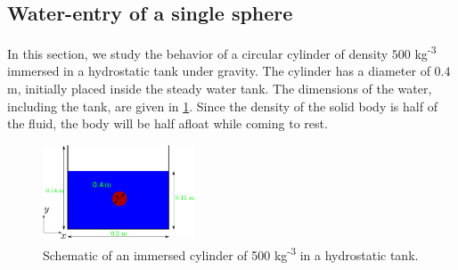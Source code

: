 



\FloatBarrier%
\subsection{Water-entry of a single sphere}
\label{sec:water-entry-sphere}
In this section, we study the behavior of a circular cylinder of density $500$
kg\textsuperscript{-3} immersed in a hydrostatic tank under gravity. The
cylinder has a diameter of $0.4$ m, initially placed inside the steady water
tank. The dimensions of the water, including the tank, are given in
\cref{fig:water-entry-sphere-schematic}. Since the density of the solid body is
half of the fluid, the body will be half afloat while coming to rest.
\begin{figure}[!htpb]
  \centering
  \includegraphics[width=0.4\textwidth]{images/rfc/images/water_entry_of_sphere/schematic}
  \caption{Schematic of an immersed cylinder of 500 kg\textsuperscript{-3}
    in a hydrostatic tank.}
\label{fig:water-entry-sphere-schematic}
\end{figure}

